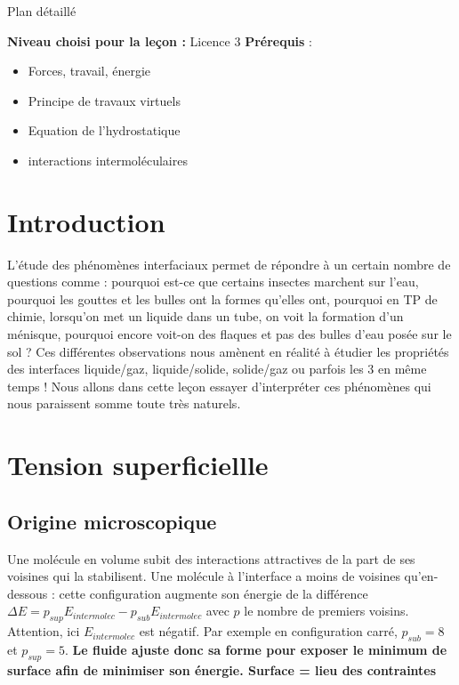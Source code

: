 \begin{reportBlock}{Plan détaillé}

  \textbf{Niveau choisi pour la leçon :} Licence 3
  \newline
  \textbf{Prérequis} : \begin{itemize}
      \item Forces, travail, énergie
      \item Principe de travaux virtuels
      \item Equation de l'hydrostatique
      \item interactions intermoléculaires
  \end{itemize}
  
  \section*{Introduction}
L'étude des phénomènes interfaciaux permet de répondre à un certain nombre de questions comme : pourquoi est-ce que certains insectes marchent sur l'eau, pourquoi les gouttes et les bulles ont la formes qu'elles ont, pourquoi en TP de chimie, lorsqu'on met un liquide dans un tube, on voit la formation d'un ménisque, pourquoi encore voit-on des flaques et pas des bulles d'eau posée sur le sol ? Ces différentes observations nous amènent en réalité à étudier les propriétés des interfaces liquide/gaz, liquide/solide, solide/gaz ou parfois les 3 en même temps ! Nous allons dans cette leçon essayer d'interpréter ces phénomènes qui nous paraissent somme toute très naturels.

  \section{Tension superficiellle}
  \subsection{Origine microscopique}
  Une molécule en volume subit des interactions attractives de la part de ses voisines qui la stabilisent. Une molécule à l'interface a moins de voisines qu'en-dessous : cette configuration augmente son énergie de la différence $\Delta E = p_{sup}E_{intermolec}-p_{sub}E_{intermolec}$ avec $p$ le nombre de premiers voisins. Attention, ici $E_{intermolec}$ est négatif. Par exemple en configuration carré, $p_{sub}=8$ et $p_{sup}=5$. \textbf{Le fluide ajuste donc sa forme pour exposer le minimum de surface afin de minimiser son énergie. Surface = lieu des contraintes}
  

\end{reportBlock}
